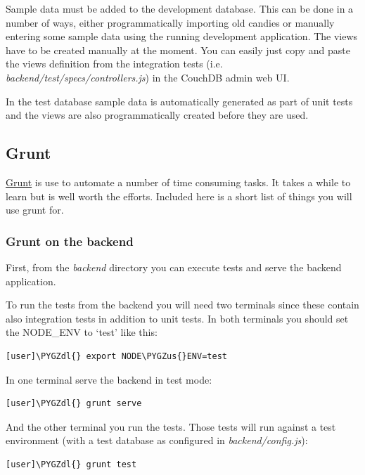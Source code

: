 \documentclass[letterpaper,10pt,english]{sphinxmanual}
\def\PYGZus{\char`\_}
\def\PYGZdl{\char`\$}
\begin{document}
Sample data must be added to the development database. This can be
done in a number of ways, either programmatically importing old
candies or manually entering some sample data using the running
development application. The views have to be created manually at the
moment. You can easily just copy and paste the views definition from
the integration tests (i.e. \emph{backend/test/specs/controllers.js}) in
the CouchDB admin web UI.

In the test database sample data is automatically generated as part of
unit tests and the views are also programmatically created before they
are used.


\subsection{Grunt}
\label{developer-guide:grunt}
\href{http://gruntjs.com/}{Grunt} is use to automate a number of time
consuming tasks. It takes a while to learn but is well worth the
efforts. Included here is a short list of things you will use grunt
for.


\subsubsection{Grunt on the backend}
\label{developer-guide:grunt-on-the-backend}
First, from the \emph{backend} directory you can execute tests and serve
the backend application.

To run the tests from the backend you will need two terminals since
these contain also integration tests in addition to unit tests. In
both terminals you should set the NODE\_ENV to `test' like this:

\begin{Verbatim}[commandchars=\\\{\}]
[user]\PYGZdl{} export NODE\PYGZus{}ENV=test
\end{Verbatim}

In one terminal serve the backend in test mode:

\begin{Verbatim}[commandchars=\\\{\}]
[user]\PYGZdl{} grunt serve
\end{Verbatim}

And the other terminal you run the tests. Those tests will run against
a test environment (with a test database as configured in
\emph{backend/config.js}):

\begin{Verbatim}[commandchars=\\\{\}]
[user]\PYGZdl{} grunt test
\end{Verbatim}
\end{document}
